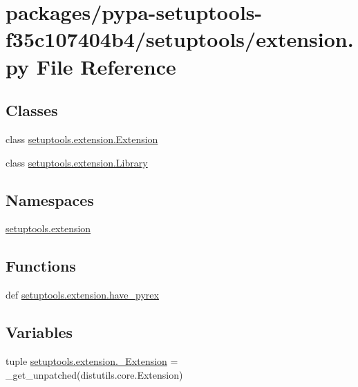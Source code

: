 \hypertarget{pypa-setuptools-f35c107404b4_2setuptools_2extension_8py}{}\section{packages/pypa-\/setuptools-\/f35c107404b4/setuptools/extension.py File Reference}
\label{pypa-setuptools-f35c107404b4_2setuptools_2extension_8py}
\subsection*{Classes}
\begin{DoxyCompactItemize}
\item 
class \hyperlink{classsetuptools_1_1extension_1_1Extension}{setuptools.\+extension.\+Extension}
\item 
class \hyperlink{classsetuptools_1_1extension_1_1Library}{setuptools.\+extension.\+Library}
\end{DoxyCompactItemize}
\subsection*{Namespaces}
\begin{DoxyCompactItemize}
\item 
 \hyperlink{namespacesetuptools_1_1extension}{setuptools.\+extension}
\end{DoxyCompactItemize}
\subsection*{Functions}
\begin{DoxyCompactItemize}
\item 
def \hyperlink{namespacesetuptools_1_1extension_ad1442147f361a8c1950195183dbae636}{setuptools.\+extension.\+have\+\_\+pyrex}
\end{DoxyCompactItemize}
\subsection*{Variables}
\begin{DoxyCompactItemize}
\item 
tuple \hyperlink{namespacesetuptools_1_1extension_a59f8a106752a29db3405d885a230572c}{setuptools.\+extension.\+\_\+\+Extension} = \+\_\+get\+\_\+unpatched(distutils.\+core.\+Extension)
\end{DoxyCompactItemize}
